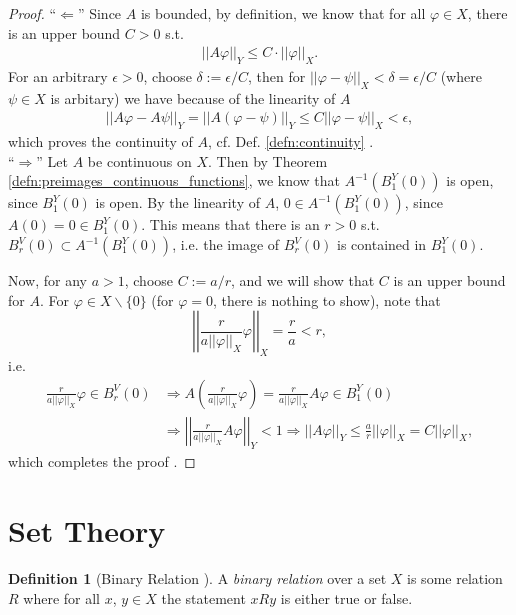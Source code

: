 \documentclass[12pt, a4paper]{article}
\numberwithin{equation}{section}
\theoremstyle{definition}
\theoremstyle{definition}
\newtheorem{defn}[thm]{Definition} %
\newcommand{\norm}[2]{\left\vert\left\vert #1 \right\vert\right\vert_{#2}}
\begin{document}
	\begin{proof}
		\enquote{$\Longleftarrow$} Since $A$ is bounded, by definition, we know that for all $\varphi\in X$, there is an upper bound $C > 0$ s.t. 
		\begin{align}
			\norm{A\varphi}{Y} \leq C\cdot \norm{\varphi}{X}.
		\end{align}
		For an arbitrary $\epsilon > 0$, choose $\delta := \epsilon/C$, then for $\norm{\varphi - \psi}{X} < \delta = \epsilon/C$ (where $\psi\in X$ is arbitary) we have because of the linearity of $A$
		\begin{align}
			\norm{A\varphi - A\psi}{Y} = \norm{A(\varphi - \psi)}{Y} \leq C\norm{\varphi - \psi}{X} < \epsilon,
		\end{align}
		which proves the continuity of $A$, cf. Def. \ref{defn:continuity} \cite{556667}.
		\\
		
		\enquote{$\Longrightarrow$} Let $A$ be continuous on $X$. Then by Theorem \ref{defn:preimages_continuous_functions}, we know that $A^{-1}\left(B^{Y}_1(0)\right)$ is open, since $B^{Y}_{1}(0)$ is open. By the linearity of $A$, $0\in A^{-1}\left(B^{Y}_1(0)\right)$, since \\ $A(0) = 0 \in B_1^{Y}(0)$. This means that there is an $r > 0$ s.t. $B^{V}_{r}(0) \subset A^{-1}\left(B^{Y}_1(0)\right)$, i.e. the image of $B^{V}_{r}(0)$ is contained in $B^{Y}_{1}(0)$.
		
		Now, for any $a > 1$, choose $C := a/r$, and we will show that $C$ is an upper bound for $A$. For $\varphi\in X\backslash \{0\}$ (for $\varphi =0$, there is nothing to show), note that $$\norm{\frac{r}{a\norm{\varphi}{X}}\varphi}{X} = \frac{r}{a} < r,$$ i.e. 
		\begin{align}
			\frac{r}{a\norm{\varphi}{X}}\varphi \in B_{r}^{V}(0) &\Rightarrow A\left(\frac{r}{a\norm{\varphi}{X}}\varphi\right) = \frac{r}{a\norm{\varphi}{X}}A\varphi\in B^{Y}_{1}(0) 
			\\[6pt] &\Rightarrow \norm{\frac{r}{a\norm{\varphi}{X}}A\varphi}{Y} < 1 \Rightarrow \norm{A\varphi}{Y} \leq \frac{a}{r}\norm{\varphi}{X} = C\norm{\varphi}{X},
		\end{align}
		which completes the proof \cite[p. 2]{src:mit_lec}.
	\end{proof}
	
	\newpage 
	\section{Set Theory}
	\begin{defn}[Binary Relation \cite{binary_relations}]
		A \textit{binary relation} over a set $X$ is some relation $R$ where for all $x$, $y\in X$ the statement $xRy$ is either true or false. 
	\end{defn}
	
\end{document}
